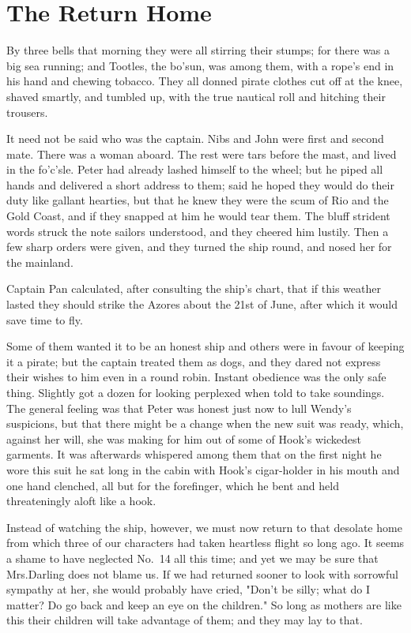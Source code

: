 
\chapter{The Return Home}

By three bells that morning they were all stirring their stumps;
for there was a big sea running;
and Tootles, the bo'sun, was among them,
with a rope's end in his hand and chewing tobacco.
They all donned pirate clothes cut off at the knee,
shaved smartly, and tumbled up,
with the true nautical roll and hitching their trousers.

It need not be said who was the captain.
Nibs and John were first and second mate.
There was a woman aboard.
The rest were tars before the mast, and lived in the fo'c'sle.
Peter had already lashed himself to the wheel;
but he piped all hands and delivered a short address to them;
said he hoped they would do their duty like gallant hearties,
but that he knew they were the scum of Rio and the Gold Coast,
and if they snapped at him he would tear them.
The bluff strident words struck the note sailors understood,
and they cheered him lustily.
Then a few sharp orders were given,
and they turned the ship round, and nosed her for the mainland.

Captain Pan calculated, after consulting the ship's chart,
that if this weather lasted they should strike the Azores about the 21st of June,
after which it would save time to fly.

Some of them wanted it to be an honest ship and others were in favour of keeping it a pirate;
but the captain treated them as dogs,
and they dared not express their wishes to him even in a round robin.
Instant obedience was the only safe thing.
Slightly got a dozen for looking perplexed when told to take soundings.
The general feeling was that Peter was honest just now to lull Wendy's suspicions,
but that there might be a change when the new suit was ready,
which, against her will, she was making for him out of some of Hook's wickedest garments.
It was afterwards whispered among them that on the first night he wore this suit
he sat long in the cabin with Hook's cigar-holder in his mouth and one hand clenched,
all but for the forefinger, which he bent and held threateningly aloft like a hook.

Instead of watching the ship, however,
we must now return to that desolate home from which three of our characters had taken heartless flight so long ago.
It seems a shame to have neglected No.~14 all this time;
and yet we may be sure that Mrs.\@ Darling does not blame us.
If we had returned sooner to look with sorrowful sympathy at her, she would probably have cried,
"Don't be silly;
what do I matter?
Do go back and keep an eye on the children."
So long as mothers are like this their children will take advantage of them;
and they may lay to that.

